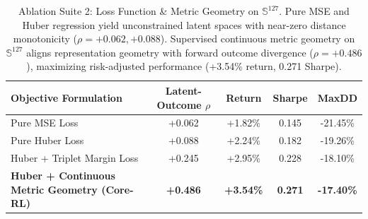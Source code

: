 \begin{table}[ht]
\centering
\small
\begin{tabular}{lcccc}
\toprule
\textbf{Objective Formulation} & \textbf{Latent-Outcome $\rho$} & \textbf{Return} & \textbf{Sharpe} & \textbf{MaxDD} \\
\midrule
Pure MSE Loss & +0.062 & +1.82\% & 0.145 & -21.45\% \\
Pure Huber Loss & +0.088 & +2.24\% & 0.182 & -19.26\% \\
Huber + Triplet Margin Loss & +0.245 & +2.95\% & 0.228 & -18.10\% \\
\textbf{Huber + Continuous Metric Geometry (Core-RL)} & \textbf{+0.486} & \textbf{+3.54\%} & \textbf{0.271} & \textbf{-17.40\%} \\
\bottomrule
\end{tabular}
\caption{Ablation Suite 2: Loss Function \& Metric Geometry on $\mathbb{S}^{127}$. Pure MSE and Huber regression yield unconstrained latent spaces with near-zero distance monotonicity ($\rho = +0.062, +0.088$). Supervised continuous metric geometry on $\mathbb{S}^{127}$ aligns representation geometry with forward outcome divergence ($\rho = +0.486$), maximizing risk-adjusted performance (+3.54\% return, 0.271 Sharpe).}
\label{tab:ablation_suite_2_metric_geometry}
\end{table}
